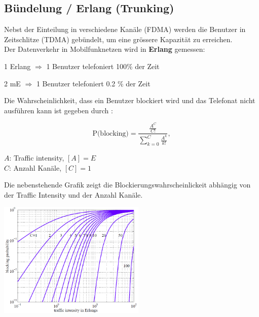 \subsection{Bündelung / Erlang (Trunking)  }
    \begin{minipage}{12cm}
    Nebst der Einteilung in verschiedene Kanäle (FDMA) werden die Benutzer in Zeitschlitze (TDMA) gebündelt,
    um eine grössere Kapazität zu erreichen. \\
    Der Datenverkehr in Mobilfunknetzen wird in \textbf{Erlang} gemessen:
    \begin{liste}
        \item 1 Erlang $\Rightarrow$ 1 Benutzer telefoniert 100\% der Zeit
        \item 2 mE $\Rightarrow$ 1 Benutzer telefoniert 0.2 \% der Zeit
    \end{liste} 
    \vspace{0.2cm}
    Die Wahrscheinlichkeit, dass ein Benutzer blockiert wird und das Telefonat nicht ausführen kann ist gegeben durch
    :        
        \begin{minipage}{6cm}
            $$   \text{P(blocking)} = \frac{\frac{A^C}{C!}}{\sum_{k=0}^C\frac{A^k}{k!}} , $$            
        \end{minipage}
        \begin{minipage}{4.5cm}
            $A$: Traffic intensity, $[A] = E$ \\        
            $C$: Anzahl Kanäle, $[C] = 1$           
        \end{minipage}       
    Die nebenstehende Grafik zeigt die Blockierungswahrscheinlickeit abhängig von der Traffic Intensity und der Anzahl Kanäle. 
    \end{minipage}
    \begin{minipage}{0.3cm}
        \quad
    \end{minipage}
    \begin{minipage}{7cm}    
        \includegraphics[width=7cm]{./bilder/systems-erlangB-graph.png}
    \end{minipage}
